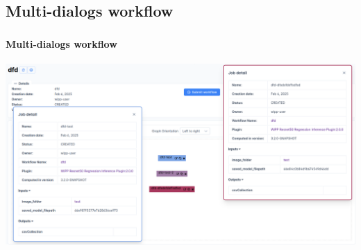 \def\slidetitle{Multi-dialogs workflow}

\subsection{\slidetitle}
\begin{frame}
  \frametitle{\sectiontitle}
  \framesubtitle{\slidetitle}

  \begin{minipage}[h!]{0.50\textwidth}
    \includegraphics[scale=0.218]{./img/multi_modals.png}
  \end{minipage}\hfill
\end{frame}
